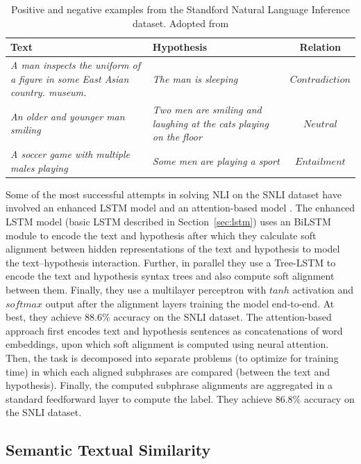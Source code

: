 \begin{table}
	\centering
	\begin{tabular}{p{8cm} | p{5cm} | c}
		Text & Hypothesis & Relation \\
		\toprule
		\textit{
		A man inspects the uniform of a figure in some East Asian country.
		museum.} & 
		\textit{The man is sleeping}
		& $\mathit{Contradiction}$ \\
		\textit{An older and younger man smiling} & 
		\textit{Two men are smiling and laughing at the cats playing on the floor}
		& $\mathit{Neutral}$ \\
		\textit{A soccer game with multiple males playing} &
		\textit{Some men are playing a sport} & $\mathit{Entailment}$ \\
		\bottomrule
	\end{tabular}
	\caption{Positive and negative examples from the Standford Natural Language Inference dataset. 
	Adopted from \citep{bowman2015large}}
	\label{tab:snli_examples}
\end{table}

Some of the most successful attempts in solving NLI on the SNLI dataset have involved
an enhanced LSTM model \citep{chen2016enhanced} and 
an attention-based model \citep{parikh2016decomposable}. 
The enhanced LSTM model (basic LSTM described in Section~\ref{sec:lstm}) 
uses an BiLSTM module to encode the text and hypothesis after which they calculate 
soft alignment between hidden representations of the text and hypothesis to model the
text--hypothesis interaction. Further, in parallel they use a Tree-LSTM to encode 
the text and hypothesis syntax trees and also compute soft alignment between them. 
Finally, they use a multilayer perceptron with $\mathit{tanh}$ activation and 
$\mathit{softmax}$ output after the alignment layers training the model end-to-end. 
At best, they achieve 88.6\% accuracy on the SNLI dataset. 
The attention-based approach \citep{parikh2016decomposable} first encodes 
text and hypothesis sentences as concatenations of word embeddings, upon which
soft alignment is computed using
neural attention. Then, the task is decomposed into separate problems (to optimize 
for training time) in which each aligned subphrases are compared (between the text and 
hypothesis). Finally, the computed subphrase alignments are aggregated in 
a standard feedforward layer to compute the label. They achieve 
86.8\% accuracy on the SNLI dataset. 

\subsection{Semantic Textual Similarity}
\label{sec:sts}


